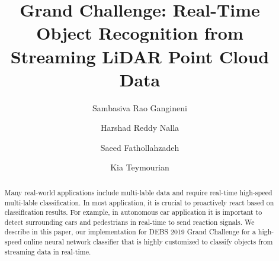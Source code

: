 \documentclass[sigconf]{acmart}
\begin{document}
%

\title{Grand Challenge: Real-Time Object Recognition from Streaming LiDAR Point Cloud Data}


%


\author{Sambasiva Rao Gangineni}

\author{Harshad Reddy Nalla}


\author{Saeed Fathollahzadeh}

\author{Kia Teymourian}



%
\renewcommand{\shortauthors}{Gangineni, et al.}

%
\begin{abstract}
Many real-world applications include multi-lable data and require real-time high-speed multi-lable classification. In most application, it is crucial to proactively react based on classification results. For example, in autonomous car application it is important to detect surrounding cars and pedestrians in real-time to send reaction signals.  We describe in this paper, our implementation for DEBS 2019 Grand Challenge for a high-speed online neural network classifier that is highly customized to classify objects from streaming data in real-time.
\end{abstract}
\end{document}
